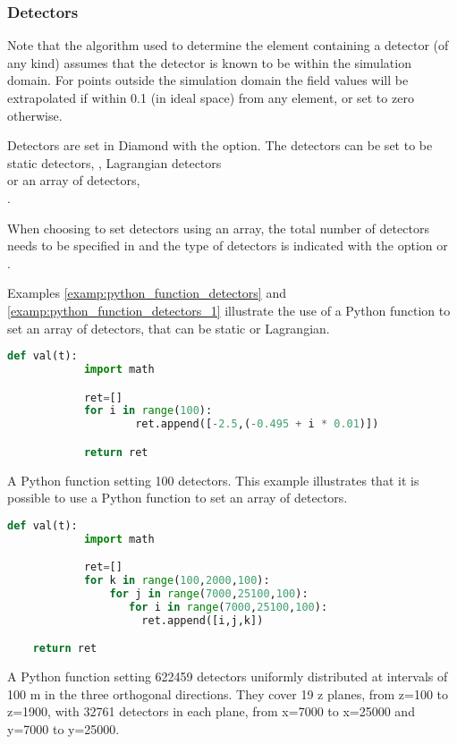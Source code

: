 \subsubsection{Detectors}
Note that the algorithm used to determine the element containing a detector (of
any kind) assumes that the detector is known to be within the simulation domain.
For points outside the simulation domain the field values will be extrapolated
if within 0.1 (in ideal space) from any element, or set to zero otherwise.

Detectors are set in Diamond with the  option. The detectors can be set to be static detectors, , Lagrangian detectors \\
 or an array of detectors, \\
.

When choosing to set detectors using an array, the total number of detectors
needs to be specified in
 and the type of
detectors is indicated with the option
 or \\
.

Examples \ref{examp:python_function_detectors} and
\ref{examp:python_function_detectors_1} illustrate the use of a Python
function to set an array of detectors, that can be static or Lagrangian.

\begin{example}
  \begin{lstlisting}[language=Python]
def val(t):
            import math

            ret=[]
            for i in range(100):
                    ret.append([-2.5,(-0.495 + i * 0.01)])

            return ret
  \end{lstlisting}
  \caption{A Python function setting 100 detectors. This
  example illustrates that it is possible to use a Python function to set an array of detectors.}
  \label{examp:python_function_detectors}
\end{example}

\begin{example}
  \begin{lstlisting}[language=Python]
def val(t):
            import math

            ret=[]
            for k in range(100,2000,100):
                for j in range(7000,25100,100):
	               for i in range(7000,25100,100):
		             ret.append([i,j,k])

	return ret
  \end{lstlisting}
  \caption{A Python function setting 622459 detectors uniformly distributed
    at intervals of 100 m in the three orthogonal directions. They cover 19 z planes, from z=100 to z=1900, with 32761 detectors in each plane, from
    x=7000 to x=25000 and y=7000 to y=25000.}
  \label{examp:python_function_detectors_1}
\end{example}


